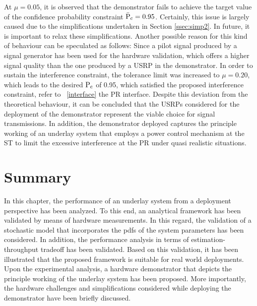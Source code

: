 At $\mu = 0.05$, it is observed that the demonstrator fails to achieve the target value of the confidence probability constraint $\bar{\text{P}}_{\text{c}} = 0.95$. Certainly, this issue is largely caused due to the simplifications undertaken in Section \ref{ssec:simp2}. In future, it is important to relax these simplifications. Another possible reason for this kind of behaviour can be speculated as follows: Since a pilot signal produced by a signal generator has been used for the hardware validation, which offers a higher signal quality than the one produced by a USRP in the demonstrator. 
In order to sustain the interference constraint, the tolerance limit was increased to $\mu = 0.20$, which leads to the desired $\text{P}_{\text{c}}$ of 0.95, which satisfied the proposed interference constraint, refer to \figurename~\ref{interface} the PR interface. Despite this deviation from the theoretical behaviour, it can be concluded that the USRPs considered for the deployment of the demonstrator represent the viable choice for signal transmissions. In addition, the demonstrator deployed captures the principle working of an underlay system that employs a power control mechanism at the ST to limit the excessive interference at the PR under quasi realistic situations. 


\section{Summary}
\label{con}

In this chapter, the performance of an underlay system from a deployment perspective has been analyzed. To this end, an analytical framework has been validated by means of hardware measurements. In this regard, the validation of a stochastic model that incorporates the pdfs of the system parameters has been considered. In addition, the performance analysis in terms of estimation-throughput tradeoff has been validated. Based on this validation, it has been illustrated that the proposed framework is suitable for real world deployments. Upon the experimental analysis, a hardware demonstrator that depicts the principle working of the underlay system has been proposed. More importantly, the hardware challenges and simplifications considered while deploying the demonstrator have been briefly discussed.  














